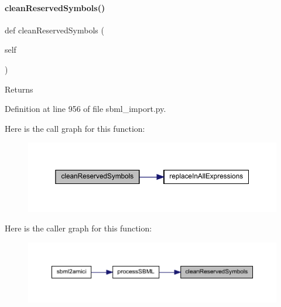 \paragraph{\texorpdfstring{cleanReservedSymbols()}{cleanReservedSymbols()}}
{\footnotesize\ttfamily def clean\+Reserved\+Symbols (\begin{DoxyParamCaption}\item[{}]{self }\end{DoxyParamCaption})}

\begin{DoxyReturn}{Returns}

\end{DoxyReturn}


Definition at line 956 of file sbml\+\_\+import.\+py.

Here is the call graph for this function\+:
\nopagebreak
\begin{figure}[H]
\begin{center}
\leavevmode
\includegraphics[width=350pt]{classamici_1_1sbml__import_1_1_sbml_importer_a122b9921e2fb5bd0fc75310c47413dd1_cgraph}
\end{center}
\end{figure}
Here is the caller graph for this function\+:
\nopagebreak
\begin{figure}[H]
\begin{center}
\leavevmode
\includegraphics[width=350pt]{classamici_1_1sbml__import_1_1_sbml_importer_a122b9921e2fb5bd0fc75310c47413dd1_icgraph}
\end{center}
\end{figure}
\mbox{\label{classamici_1_1sbml__import_1_1_sbml_importer_a5348e7b5041334f8c54b45c5c928dea0}} 
